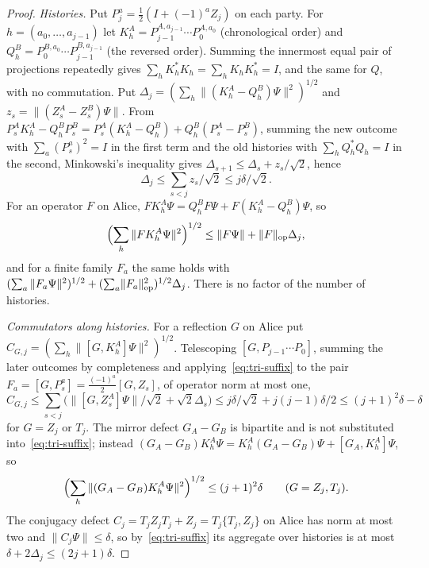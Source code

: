\begin{proof}
\emph{Histories.} Put $P^{a}_j=\frac12(I+(-1)^aZ_j)$ on each party. For $h=(a_0,\dots,a_{j-1})$ let
$K_h^A=P^{A,a_{j-1}}_{j-1}\cdots P^{A,a_0}_0$ (chronological order) and $Q_h^B=P^{B,a_0}_0\cdots P^{B,a_{j-1}}_{j-1}$ (the
reversed order). Summing the innermost equal pair of projections repeatedly gives
$\sum_hK_h^*K_h=\sum_hK_hK_h^*=I$, and the same for $Q$, with no commutation. Put
$\Delta_j=(\sum_h\|(K_h^A-Q_h^B)\Psi\|^2)^{1/2}$ and $z_s=\|(Z^A_s-Z^B_s)\Psi\|$. From
$P_s^AK_h^A-Q_h^BP_s^B=P^A_s(K^A_h-Q^B_h)+Q^B_h(P^A_s-P^B_s)$, summing the new outcome with $\sum_a(P^a_s)^2=I$ in the first
term and the old histories with $\sum_hQ_h^*Q_h=I$ in the second, Minkowski's inequality gives
$\Delta_{s+1}\le\Delta_s+z_s/\sqrt2$, hence
\begin{equation}\label{eq:tri-hist}
\Delta_j\le\sum_{s<j}z_s/\sqrt2\le j\delta/\sqrt2 .
\end{equation}
For an operator $F$ on Alice, $FK^A_h\Psi=Q^B_hF\Psi+F(K^A_h-Q^B_h)\Psi$, so
\begin{equation}\label{eq:tri-suffix}
\Bigl(\sum_h\|FK^A_h\Psi\|^2\Bigr)^{1/2}\le\|F\Psi\|+\lVert F\rVert_{\mathrm{op}}\Delta_j ,
\end{equation}
and for a finite family $F_a$ the same holds with $(\sum_a\|F_a\Psi\|^2)^{1/2}+(\sum_a\lVert F_a\rVert_{\mathrm{op}}^2)^{1/2}\Delta_j$. There is
no factor of the number of histories.

\emph{Commutators along histories.} For a reflection $G$ on Alice put $C_{G,j}=(\sum_h\|[G,K_h^A]\Psi\|^2)^{1/2}$.
Telescoping $[G,P_{j-1}\cdots P_0]$, summing the later outcomes by completeness and applying~\eqref{eq:tri-suffix} to
the pair $F_a=[G,P^a_s]=\frac{(-1)^a}2[G,Z_s]$, of operator norm at most one,
\[
C_{G,j}\le\sum_{s<j}\bigl(\|[G,Z^A_s]\Psi\|/\sqrt2+\sqrt2\Delta_s\bigr)\le j\delta/\sqrt2+j(j-1)\delta/2\le(j+1)^2\delta-\delta
\]
for $G=Z_j$ or $T_j$. The mirror defect $G_A-G_B$ is bipartite and is not substituted into~\eqref{eq:tri-suffix};
instead $(G_A-G_B)K_h^A\Psi=K_h^A(G_A-G_B)\Psi+[G_A,K_h^A]\Psi$, so
\begin{equation}\label{eq:tri-mirror}
\Bigl(\sum_h\|(G_A-G_B)K_h^A\Psi\|^2\Bigr)^{1/2}\le(j+1)^2\delta\qquad(G=Z_j,T_j).
\end{equation}
The conjugacy defect $C_j=T_jZ_jT_j+Z_j=T_j\{T_j,Z_j\}$ on Alice has norm at most two and $\|C_j\Psi\|\le\delta$, so
by~\eqref{eq:tri-suffix} its aggregate over histories is at most $\delta+2\Delta_j\le(2j+1)\delta$.


\end{proof}
